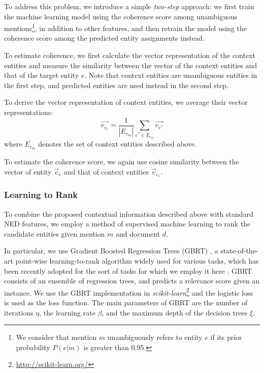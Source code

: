 \documentclass[11pt,letterpaper]{article}
\begin{document}
To address this problem, we introduce a simple \textit{two-step} approach:
we first train the machine learning model using the coherence score among unambiguous mentions\footnote{We consider that mention $m$ unambiguously refers to entity $e$ if its prior probability $P(e|m)$ is greater than 0.95.}, in addition to other features, and then retrain the model using the coherence score among the predicted entity assignments instead.

To estimate coherence, we first calculate the vector representation of the context entities and measure the similarity between the vector of the context entities and that of the target entity $e$.
Note that context entities are unambiguous entities in the first step, and predicted entities are used instead in the second step.

To derive the vector representation of context entities, we average their vector representations:
\begin{equation}
\vec{v_{c_e}} = \frac{1}{|E_{c_m}|}\sum_{e^* \in E_{c_m}}\vec{v_{e^*}}
\end{equation}
where $E_{c_m}$ denotes the set of context entities described above.

To estimate the coherence score, we again use cosine similarity between the vector of entity $\vec{v}_e$ and that of context entities $\vec{v}_{c_e}$.

\subsubsection{Learning to Rank}
\label{subsubsec:learning-to-rank}

To combine the proposed contextual information described above with standard NED features, we employ a method of supervised machine learning to rank the candidate entities given mention $m$ and document $d$.

In particular, we use Gradient Boosted Regression Trees (GBRT) \cite{Friedman2001}, a state-of-the-art point-wise learning-to-rank algorithm widely used for various tasks, which has been recently adopted for the sort of tasks for which we employ it here \cite{Meij2012}.
GBRT consists of an ensemble of regression trees, and predicts a relevance score given an instance.
We use the GBRT implementation in \textit{scikit-learn}\footnote{\url{http://scikit-learn.org/}} and the logistic loss is used as the loss function.
The main parameters of GBRT are the number of iterations $\eta$, the learning rate $\beta$, and the maximum depth of the decision trees $\xi$.
\end{document}
